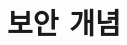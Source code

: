 \documentclass{article}
\theoremstyle{definition}
\begin{document}


\newpage
\section{보안 개념}


\end{document}
